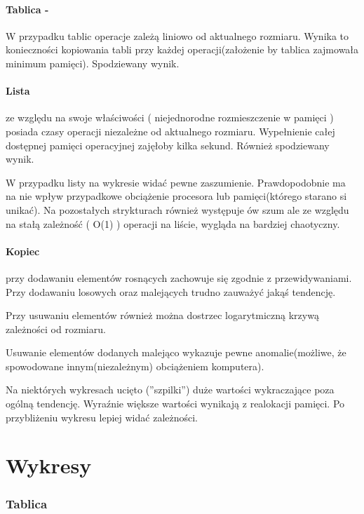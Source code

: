 \documentclass[polish, 11pt]{article}
\begin{document}
		\paragraph{Tablica - }
		W przypadku tablic operacje zależą liniowo od aktualnego rozmiaru.	Wynika to konieczności kopiowania tabli przy każdej operacji(założenie by tablica zajmowała minimum pamięci). Spodziewany wynik.
		\paragraph{Lista}
		 ze względu na swoje właściwości ( niejednorodne rozmieszczenie w pamięci ) posiada czasy operacji niezależne od aktualnego rozmiaru. Wypełnienie całej dostępnej pamięci operacyjnej zajęłoby kilka sekund.	Również spodziewany wynik.
		 \par
		 W przypadku listy na wykresie widać pewne zaszumienie. Prawdopodobnie ma na nie wpływ przypadkowe obciążenie procesora lub pamięci(którego starano si unikać). Na pozostałych strykturach również występuje ów szum ale ze względu na stałą zależność ( O(1) ) operacji na liście, wygląda na bardziej chaotyczny.
		\paragraph{Kopiec}
		przy dodawaniu elementów rosnących zachowuje się zgodnie z przewidywaniami. Przy dodawaniu  losowych oraz malejących trudno zauważyć jakąś tendencję. 
		\par
		Przy usuwaniu elementów również można dostrzec logarytmiczną krzywą zależności od rozmiaru. 
		\par
		Usuwanie elementów dodanych malejąco wykazuje pewne anomalie(możliwe, że spowodowane innym(niezależnym) obciążeniem komputera).
		\par 
		Na niektórych wykresach ucięto (''szpilki'') duże wartości wykraczające poza ogólną tendencję. Wyraźnie większe wartości wynikają z realokacji pamięci. Po przybliżeniu wykresu lepiej widać zależności.
		
		
		
		\section{Wykresy}				
		\subsubsection{Tablica}		
		
\end{document}
